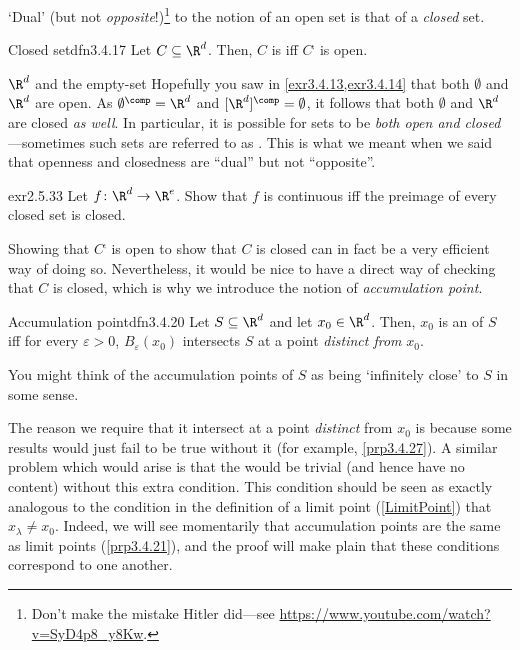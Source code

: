 `Dual' (but not \emph{opposite}!)\footnote{Don't make the mistake Hitler did---see \url{https://www.youtube.com/watch?v=SyD4p8_y8Kw}.} to the notion of an open set is that of a \emph{closed} set.
\begin{dfn}{Closed set}{dfn3.4.17}
Let $C\subseteq \R ^d$.  Then, $C$ is  iff $C^{\comp}$ is open.
\end{dfn}
\begin{exm}{$\R ^d$ and the empty-set}{}
Hopefully you saw in \cref{exr3.4.13,exr3.4.14} that both $\emptyset$ and $\R ^d$ are open.  As $\emptyset ^{\comp}=\R ^d$ and $[\R ^d]^{\comp}=\emptyset$, it follows that both $\emptyset$ and $\R ^d$ are closed \emph{as well}.  In particular, it is possible for sets to be \emph{both open and closed}---sometimes such sets are referred to as .  This is what we meant when we said that openness and closedness are ``dual'' but not ``opposite''.
\end{exm}
\begin{exr}{}{exr2.5.33}
Let $f\colon \R ^d\rightarrow \R ^e$.  Show that $f$ is continuous iff the preimage of every closed set is closed.
\end{exr}
Showing that $C^{\comp}$ is open to show that $C$ is closed can in fact be a very efficient way of doing so.  Nevertheless, it would be nice to have a direct way of checking that $C$ is closed, which is why we introduce the notion of \emph{accumulation point}.
\begin{dfn}{Accumulation point}{dfn3.4.20}
Let $S\subseteq \R ^d$ and let $x_0\in \R ^d$.  Then, $x_0$ is an  of $S$ iff for every $\varepsilon >0$, $B_\varepsilon (x_0)$ intersects $S$ at a point \emph{distinct from} $x_0$.
\begin{rmk}
You might think of the accumulation points of $S$ as being `infinitely close' to $S$ in some sense.
\end{rmk}
\begin{rmk}
The reason we require that it intersect at a point \emph{distinct} from $x_0$ is because some results would just fail to be true without it (for example, \cref{prp3.4.27}).  A similar problem which would arise is that the  would be trivial (and hence have no content) without this extra condition.  This condition should be seen as exactly analogous to the condition in the definition of a limit point (\cref{LimitPoint}) that $x_{\lambda}\neq x_0$.  Indeed, we will see momentarily that accumulation points are the same as limit points (\cref{prp3.4.21}), and the proof will make plain that these conditions correspond to one another.
\end{rmk}
\end{dfn}
